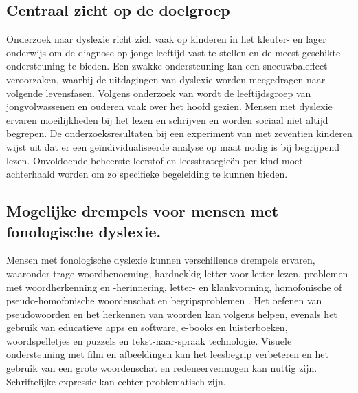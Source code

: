 \subsection{Centraal zicht op de doelgroep}


Onderzoek naar dyslexie richt zich vaak op kinderen in het kleuter- en lager onderwijs om de diagnose op jonge leeftijd vast te stellen en de meest geschikte ondersteuning te bieden. Een zwakke ondersteuning kan een sneeuwbaleffect veroorzaken, waarbij de uitdagingen van dyslexie worden meegedragen naar volgende levensfasen. Volgens onderzoek van \textcite{Lissens2020} wordt de leeftijdsgroep van jongvolwassenen en ouderen vaak over het hoofd gezien. Mensen met dyslexie ervaren moeilijkheden bij het lezen en schrijven en worden sociaal niet altijd begrepen. De onderzoeksresultaten bij een experiment van \textcite{VanVreckem2015} met zeventien kinderen wijst uit dat er een geïndividualiseerde analyse op maat nodig is bij begrijpend lezen. Onvoldoende beheerste leerstof en leesstrategieën per kind moet achterhaald worden om zo specifieke begeleiding te kunnen bieden. 

\subsection{Mogelijke drempels voor mensen met fonologische dyslexie.}

Mensen met fonologische dyslexie kunnen verschillende drempels ervaren, waaronder trage woordbenoeming, hardnekkig letter-voor-letter lezen, problemen met woordherkenning en -herinnering, letter- en klankvorming, homofonische of pseudo-homofonische woordenschat en begripsproblemen \autocite{Bonte2020, RiveroContreras2021, Zhang2021}. Het oefenen van pseudowoorden en het herkennen van woorden kan volgens \textcite{Filipak2020} helpen, evenals het gebruik van educatieve apps en software, e-books en luisterboeken, woordspelletjes en puzzels en tekst-naar-spraak technologie. Visuele ondersteuning met film en afbeeldingen kan het leesbegrip verbeteren en het gebruik van een grote woordenschat en redeneervermogen kan nuttig zijn. Schriftelijke expressie kan echter problematisch zijn.

